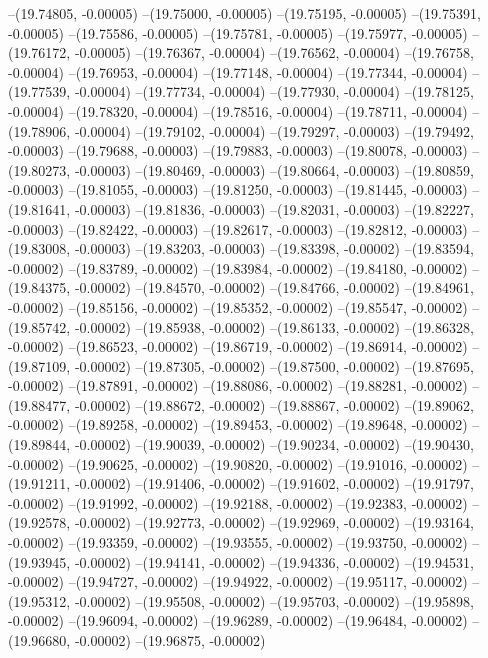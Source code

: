 --(19.74805, -0.00005)
--(19.75000, -0.00005)
--(19.75195, -0.00005)
--(19.75391, -0.00005)
--(19.75586, -0.00005)
--(19.75781, -0.00005)
--(19.75977, -0.00005)
--(19.76172, -0.00005)
--(19.76367, -0.00004)
--(19.76562, -0.00004)
--(19.76758, -0.00004)
--(19.76953, -0.00004)
--(19.77148, -0.00004)
--(19.77344, -0.00004)
--(19.77539, -0.00004)
--(19.77734, -0.00004)
--(19.77930, -0.00004)
--(19.78125, -0.00004)
--(19.78320, -0.00004)
--(19.78516, -0.00004)
--(19.78711, -0.00004)
--(19.78906, -0.00004)
--(19.79102, -0.00004)
--(19.79297, -0.00003)
--(19.79492, -0.00003)
--(19.79688, -0.00003)
--(19.79883, -0.00003)
--(19.80078, -0.00003)
--(19.80273, -0.00003)
--(19.80469, -0.00003)
--(19.80664, -0.00003)
--(19.80859, -0.00003)
--(19.81055, -0.00003)
--(19.81250, -0.00003)
--(19.81445, -0.00003)
--(19.81641, -0.00003)
--(19.81836, -0.00003)
--(19.82031, -0.00003)
--(19.82227, -0.00003)
--(19.82422, -0.00003)
--(19.82617, -0.00003)
--(19.82812, -0.00003)
--(19.83008, -0.00003)
--(19.83203, -0.00003)
--(19.83398, -0.00002)
--(19.83594, -0.00002)
--(19.83789, -0.00002)
--(19.83984, -0.00002)
--(19.84180, -0.00002)
--(19.84375, -0.00002)
--(19.84570, -0.00002)
--(19.84766, -0.00002)
--(19.84961, -0.00002)
--(19.85156, -0.00002)
--(19.85352, -0.00002)
--(19.85547, -0.00002)
--(19.85742, -0.00002)
--(19.85938, -0.00002)
--(19.86133, -0.00002)
--(19.86328, -0.00002)
--(19.86523, -0.00002)
--(19.86719, -0.00002)
--(19.86914, -0.00002)
--(19.87109, -0.00002)
--(19.87305, -0.00002)
--(19.87500, -0.00002)
--(19.87695, -0.00002)
--(19.87891, -0.00002)
--(19.88086, -0.00002)
--(19.88281, -0.00002)
--(19.88477, -0.00002)
--(19.88672, -0.00002)
--(19.88867, -0.00002)
--(19.89062, -0.00002)
--(19.89258, -0.00002)
--(19.89453, -0.00002)
--(19.89648, -0.00002)
--(19.89844, -0.00002)
--(19.90039, -0.00002)
--(19.90234, -0.00002)
--(19.90430, -0.00002)
--(19.90625, -0.00002)
--(19.90820, -0.00002)
--(19.91016, -0.00002)
--(19.91211, -0.00002)
--(19.91406, -0.00002)
--(19.91602, -0.00002)
--(19.91797, -0.00002)
--(19.91992, -0.00002)
--(19.92188, -0.00002)
--(19.92383, -0.00002)
--(19.92578, -0.00002)
--(19.92773, -0.00002)
--(19.92969, -0.00002)
--(19.93164, -0.00002)
--(19.93359, -0.00002)
--(19.93555, -0.00002)
--(19.93750, -0.00002)
--(19.93945, -0.00002)
--(19.94141, -0.00002)
--(19.94336, -0.00002)
--(19.94531, -0.00002)
--(19.94727, -0.00002)
--(19.94922, -0.00002)
--(19.95117, -0.00002)
--(19.95312, -0.00002)
--(19.95508, -0.00002)
--(19.95703, -0.00002)
--(19.95898, -0.00002)
--(19.96094, -0.00002)
--(19.96289, -0.00002)
--(19.96484, -0.00002)
--(19.96680, -0.00002)
--(19.96875, -0.00002)

